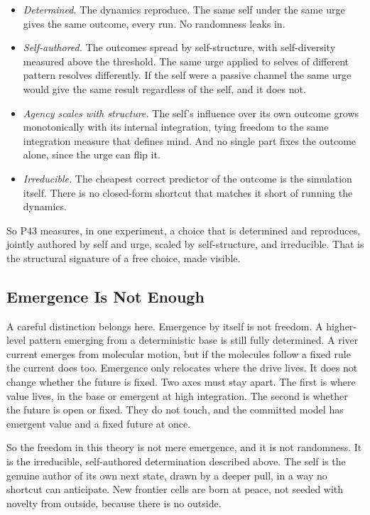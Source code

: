 \begin{itemize}
\item \emph{Determined.} The dynamics reproduce. The same self under the same urge gives the same outcome, every run. No randomness leaks in.
\item \emph{Self-authored.} The outcomes spread by self-structure, with self-diversity measured above the threshold. The same urge applied to selves of different pattern resolves differently. If the self were a passive channel the same urge would give the same result regardless of the self, and it does not.
\item \emph{Agency scales with structure.} The self's influence over its own outcome grows monotonically with its internal integration, tying freedom to the same integration measure that defines mind. And no single part fixes the outcome alone, since the urge can flip it.
\item \emph{Irreducible.} The cheapest correct predictor of the outcome is the simulation itself. There is no closed-form shortcut that matches it short of running the dynamics.
\end{itemize}

So P43 measures, in one experiment, a choice that is determined and reproduces, jointly authored by self and urge, scaled by self-structure, and irreducible. That is the structural signature of a free choice, made visible.

\subsection{Emergence Is Not Enough}

A careful distinction belongs here. Emergence by itself is not freedom. A higher-level pattern emerging from a deterministic base is still fully determined. A river current emerges from molecular motion, but if the molecules follow a fixed rule the current does too. Emergence only relocates where the drive lives. It does not change whether the future is fixed. Two axes must stay apart. The first is where value lives, in the base or emergent at high integration. The second is whether the future is open or fixed. They do not touch, and the committed model has emergent value and a fixed future at once.

So the freedom in this theory is not mere emergence, and it is not randomness. It is the irreducible, self-authored determination described above. The self is the genuine author of its own next state, drawn by a deeper pull, in a way no shortcut can anticipate. New frontier cells are born at peace, not seeded with novelty from outside, because there is no outside.

